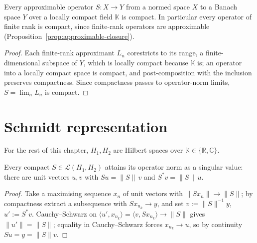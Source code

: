 \begin{theorem}
\label{thm:approximable-implies-compact}
\leanok
{}
Every approximable operator $S : X \to Y$ from a normed space $X$ to a
Banach space $Y$ over a locally compact field $\mathbb{K}$ is compact. In
particular every operator of finite rank is compact, since finite-rank
operators are approximable (Proposition~\ref{prop:approximable-closure}).
\end{theorem}
\begin{proof}
\leanok
Each finite-rank approximant $L_n$ corestricts to its range, a
finite-dimensional subspace of $Y$, which is locally compact because
$\mathbb{K}$ is; an operator into a locally compact space is compact, and
post-composition with the inclusion preserves compactness. Since
compactness passes to operator-norm limits, $S = \lim_n L_n$ is compact.
\end{proof}

\section{Schmidt representation}
\label{sec:svd-schmidt}

For the rest of this chapter, $H_1, H_2$ are Hilbert spaces over
$\mathbb{K} \in \{\mathbb{R}, \mathbb{C}\}$.

\begin{theorem}
\label{thm:norm-singular-value}
\leanok
Every compact $S \in \mathcal{L}(H_1, H_2)$ attains its operator norm as a
singular value: there are unit vectors $u, v$ with $S u = \|S\| \, v$ and
$S^* v = \|S\| \, u$.
\end{theorem}
\begin{proof}
\leanok
Take a maximising sequence $x_n$ of unit vectors with $\|S x_n\| \to \|S\|$;
by compactness extract a subsequence with $S x_{n_k} \to y$, and set
$v := \|S\|^{-1} y$, $u' := S^* v$. Cauchy--Schwarz on
$\langle u', x_{n_k}\rangle = \langle v, S x_{n_k}\rangle \to \|S\|$ gives
$\|u'\| = \|S\|$; equality in Cauchy--Schwarz forces $x_{n_k} \to u$, so by
continuity $S u = y = \|S\| v$.
\end{proof}

